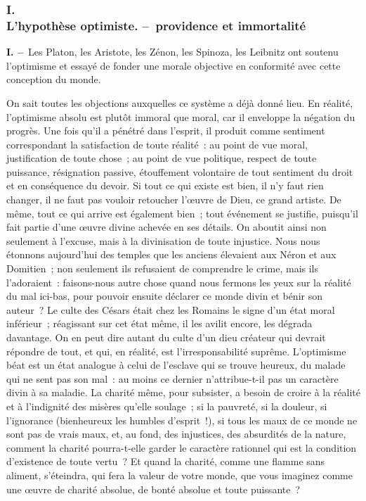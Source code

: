 \documentclass[french,twoside]{book} %
\begin{document}
\subsubsection[{I. L’hypothèse optimiste. – providence et immortalité}]{I. \\
L’hypothèse optimiste. – providence et immortalité}
\noindent \textbf{I. –} Les Platon, les Aristote, les Zénon, les Spinoza, les Leibnitz ont soutenu l’optimisme et essayé de fonder une morale objective en conformité avec cette conception du monde.\par
On sait toutes les objections auxquelles ce système a déjà donné lieu. En réalité, l’optimisme absolu est plutôt immoral que moral, car il enveloppe la négation du progrès. Une fois qu’il a pénétré dans l’esprit, il produit comme sentiment correspondant la satisfaction de toute réalité : au point de vue moral, justification de toute chose ; au point de vue politique, respect de toute puissance, résignation passive, étouffement volontaire de tout sentiment du droit et en conséquence du devoir. Si tout ce qui existe est bien, il n’y faut rien changer, il ne faut pas vouloir retoucher l’œuvre de Dieu, ce grand artiste. De même, tout ce qui arrive est également bien ; tout événement se justifie, puisqu’il fait partie d’une œuvre divine achevée en ses détails. On aboutit ainsi non seulement à l’excuse, mais à la divinisation de toute injustice. Nous nous étonnons aujourd’hui des temples que les anciens élevaient aux Néron et aux Domitien ; non seulement ils refusaient de comprendre le crime, mais ils l’adoraient : faisons-nous autre chose quand nous fermons les yeux sur la réalité du mal ici-bas, pour pouvoir ensuite déclarer ce monde divin et bénir son auteur ? Le culte des Césars était chez les Romains le signe d’un état moral inférieur ; réagissant sur cet état même, il les avilit encore, les dégrada davantage. On en peut dire autant du culte d’un dieu créateur qui devrait répondre de tout, et qui, en réalité, est l’irresponsabilité suprême. L’optimisme béat est un état analogue à celui de l’esclave qui se trouve heureux, du malade qui ne sent pas son mal : au moins ce dernier n’attribue-t-il pas un caractère divin à sa maladie. La charité même, pour subsister, a besoin de croire à la réalité et à l’indignité des misères qu’elle soulage ; si la pauvreté, si la douleur, si l’ignorance (bienheureux les humbles d’esprit !), si tous les maux de ce monde ne sont pas de vrais maux, et, au fond, des injustices, des absurdités de la nature, comment la charité pourra-t-elle garder le caractère rationnel qui est la condition d’existence de toute vertu ? Et quand la charité, comme une flamme sans aliment, s’éteindra, qui fera la valeur de votre monde, que vous imaginez comme une œuvre de charité absolue, de bonté absolue et toute puissante ?\par
\end{document}
